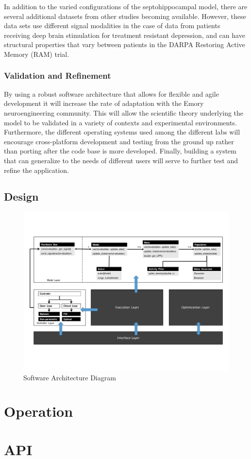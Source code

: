 \documentclass[11pt, oneside]{article}   	%
\begin{document}
In addition to the varied configurations of the septohippocampal model, there are several additional datasets from other studies becoming available. However, these data sets use different signal modalities in the case of data from patients receiving deep brain stimulation for treatment resistant depression, and can have structural properties that vary between patients in the DARPA Restoring Active Memory (RAM) trial. 

\subsubsection{Validation and Refinement}
By using a robust software architecture that allows for flexible and agile development it will increase the rate of adaptation with the Emory neuroengineering community. This will allow the scientific theory underlying the model to be validated in a variety of contexts and experimental environments. Furthermore, the different operating systems used among the different labs will encourage cross-platform development and testing from the ground up rather than porting after the code base is more developed. Finally, building a system that can generalize to the needs of different users will serve to further test and refine the application.

\subsection{Design}
\begin{figure}[h!]
	\centering
	\includegraphics[width=\textwidth,height=\textheight,keepaspectratio]{Software_Architecture.pdf}
	\caption{Software Architecture Diagram}
\end{figure}

\section{Operation}
\section{API}
\end{document}
